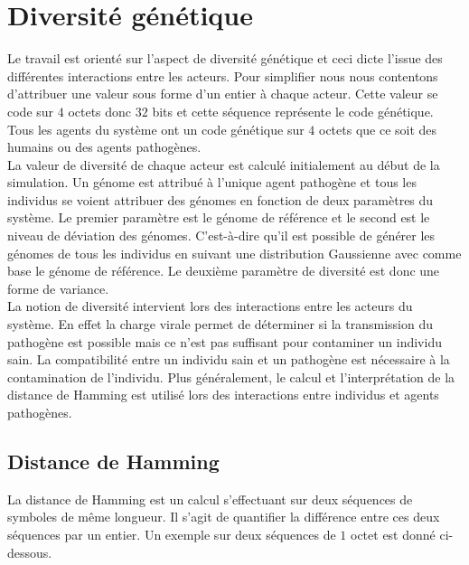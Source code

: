 \section{Diversité génétique}

Le travail est orienté sur l'aspect de diversité génétique et ceci dicte l'issue des différentes interactions entre les acteurs. Pour simplifier nous nous contentons d'attribuer une valeur sous forme d'un entier à chaque acteur. Cette valeur se code sur $4$ octets donc $32$ bits et cette séquence représente le code génétique. Tous les agents du système ont un code génétique sur $4$ octets que ce soit des humains ou des agents pathogènes.\\

La valeur de diversité de chaque acteur est calculé initialement au début de la simulation. Un génome est attribué à l'unique agent pathogène et tous les individus se voient attribuer des génomes en fonction de deux paramètres du système. Le premier paramètre est le génome de référence et le second est le niveau de déviation des génomes. C'est-à-dire qu'il est possible de générer les génomes de tous les individus en suivant une distribution Gaussienne avec comme base le génome de référence. Le deuxième paramètre de diversité est donc une forme de variance.\\

La notion de diversité intervient lors des interactions entre les acteurs du système. En effet la charge virale permet de déterminer si la transmission du pathogène est possible mais ce n'est pas suffisant pour contaminer un individu sain. La compatibilité entre un individu sain et un pathogène est nécessaire à la contamination de l'individu. Plus généralement, le calcul et l'interprétation de la distance de Hamming est utilisé lors des interactions entre individus et agents pathogènes.

\subsection{Distance de Hamming}

La distance de Hamming est un calcul s'effectuant sur deux séquences de symboles de même longueur. Il s'agit de quantifier la différence entre ces deux séquences par un entier. Un exemple sur deux séquences de $1$ octet est donné ci-dessous.\\

